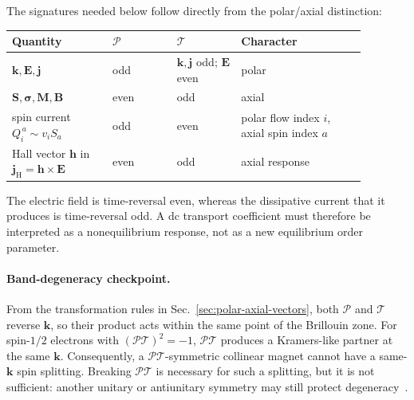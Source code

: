 The signatures needed below follow directly from the polar/axial distinction:
\begin{center}
    \renewcommand{\arraystretch}{1.18}
    \small
    \begin{tabular}{|p{0.25\linewidth}|p{0.16\linewidth}|p{0.16\linewidth}|p{0.31\linewidth}|}
        \hline
        Quantity                                               & $\mathcal{P}$ & $\mathcal{T}$ & Character      \\
        \hline
        $\mathbf{k},\mathbf{E},\mathbf{j}$                     & odd           &
        $\mathbf{k},\mathbf{j}$ odd; $\mathbf{E}$ even         & polar                                          \\
        \hline
        $\mathbf{S},\boldsymbol{\sigma},\mathbf{M},\mathbf{B}$ & even          & odd           & axial          \\
        \hline
        spin current $Q_i^{\,a}\sim v_iS_a$                    & odd           & even          &
        polar flow index $i$, axial spin index $a$                                                              \\
        \hline
        Hall vector $\mathbf{h}$ in $\mathbf{j}_{\mathrm H}=\mathbf{h}\times\mathbf{E}$
                                                               & even          & odd           & axial response \\
        \hline
    \end{tabular}
\end{center}
The electric field is time-reversal even, whereas the dissipative current that
it produces is time-reversal odd.  A dc transport coefficient must therefore
be interpreted as a nonequilibrium response, not as a new equilibrium order
parameter.

\paragraph{Band-degeneracy checkpoint.}
From the transformation rules in Sec.~\ref{sec:polar-axial-vectors}, both
$\mathcal{P}$ and $\mathcal{T}$ reverse $\mathbf{k}$, so their product acts
within the same point of the Brillouin zone.  For spin-$1/2$ electrons with
$(\mathcal{PT})^2=-1$, $\mathcal{PT}$ produces a Kramers-like partner at the
same $\mathbf{k}$.  Consequently, a $\mathcal{PT}$-symmetric collinear magnet
cannot have a same-$\mathbf{k}$ spin splitting.  Breaking $\mathcal{PT}$ is
necessary for such a splitting, but it is not sufficient: another unitary or
antiunitary symmetry may still protect degeneracy~\cite{smejkal2022altermagnet,
    jungwirth2026altermagnet-symmetry}.

